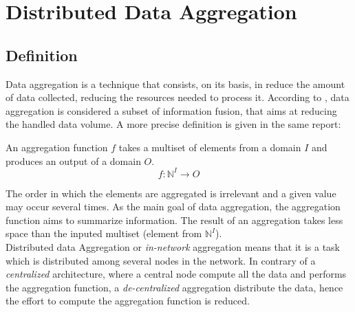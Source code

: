 \chapter{Distributed Data Aggregation}\label{chap:dda}
\section{Definition}
Data aggregation is a technique that consists, on its basis, in reduce the amount of data collected, reducing the resources needed to process it.  According to \cite{journals/corr/abs-1110-0725}, data aggregation is  considered a subset of information fusion, that aims at reducing the handled data volume. A more precise definition is given in the same report:
\begin{definition} An aggregation function $f$ takes a multiset of elements from a domain $I$ and produces an output of a domain $O$.
\begin{equation*} f : \mathbb{N}^I \to O \end{equation*}
\end{definition}
The order in which the elements are aggregated is irrelevant and a given value may occur several times. As the main goal of data aggregation, the aggregation function aims to summarize information. The result of an aggregation takes less space than the inputed multiset (element from $\mathbb{N}^I$).\\
Distributed data Aggregation or \textit{in-network} aggregation means that it is a task which is distributed among several nodes in the network. In contrary of a \textit{centralized} architecture, where a central node compute all the data and performs the aggregation function, a \textit{de-centralized} aggregation distribute the data, hence the effort to compute the aggregation function is reduced.
